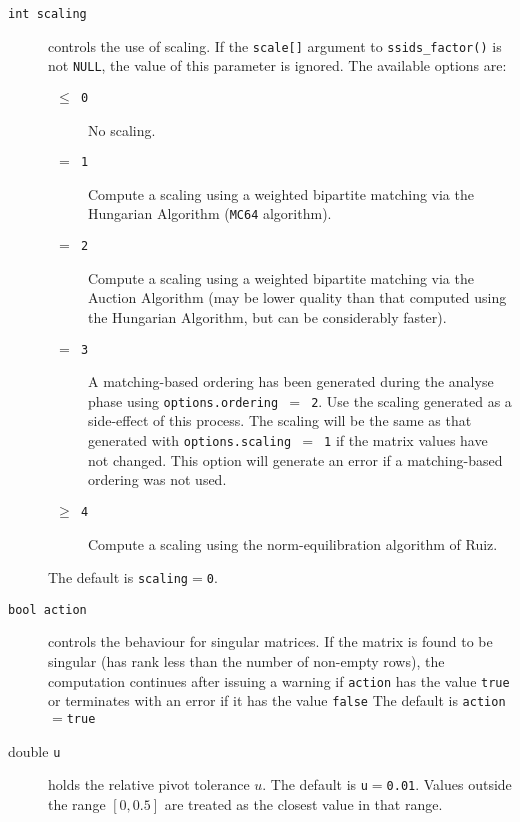 \begin{description}
\item[\texttt{int scaling}] controls
the use of scaling. If the {\tt scale[]} argument to {\tt ssids\_factor()} is
not \texttt{NULL}, the value of this parameter is ignored. The available
options are:
\begin{description}
   \item[\texttt{ $\le$ 0 }] No scaling.
   \item[\texttt{ $=$ 1 }] Compute a scaling using a weighted bipartite matching
      via the Hungarian Algorithm (\texttt{MC64} algorithm).
   \item[\texttt{ $=$ 2 }] Compute a scaling using a weighted bipartite matching
      via the Auction Algorithm (may be lower quality than that computed using 
      the Hungarian Algorithm, but can be considerably faster).
   \item[\texttt{ $=$ 3 }] A matching-based ordering has been generated during the
      analyse phase using {\tt options.ordering $=$ 2}. Use the
      scaling generated as a side-effect of this process. The scaling will be
      the same as that generated with {\tt options.scaling $=$ 1} if the matrix
      values have not changed. This option will generate an error if a
      matching-based ordering was not used.
   \item[\texttt{ $\ge$ 4 }] Compute a scaling using the norm-equilibration
      algorithm of Ruiz.
\end{description}
The default is {\tt scaling}$=${\tt 0}.

\end{description}


\begin{description}
\item[\texttt{bool action}] controls the behaviour for singular matrices.
If the matrix is found to be singular (has rank less than the number of
non-empty rows), the computation continues after issuing a warning if
{\tt action} has the value {\tt true} or
terminates with an error if it has the value {\tt false}
The default is {\tt action}$=${\tt true}


\item[double \texttt{u}] holds the relative pivot
tolerance $u$.
The default is {\tt u}$=${\tt 0.01}.
Values outside the range $[0,0.5]$ are treated as the closest value in that range.

\end{description}

